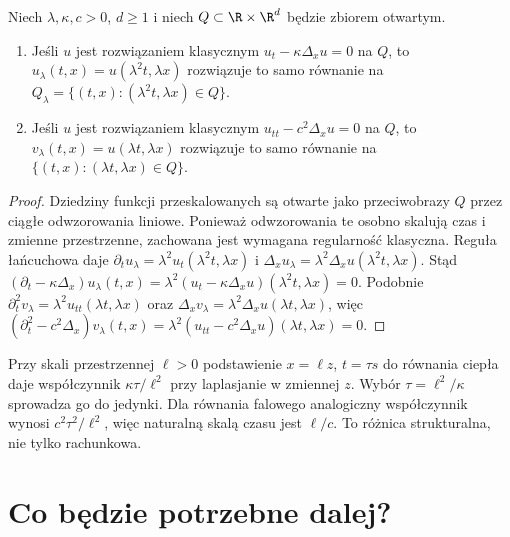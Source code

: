 \begin{stwierdzenie}
Niech $\lambda,\kappa,c>0$, $d\geq1$ i niech
$Q\subset\R\times\R^d$ będzie zbiorem otwartym.
\begin{enumerate}
\item Jeśli $u$ jest rozwiązaniem klasycznym
$u_t-\kappa\Delta_xu=0$ na $Q$, to
$u_\lambda(t,x)=u(\lambda^2t,\lambda x)$
rozwiązuje to samo równanie na
$Q_\lambda=\{(t,x):(\lambda^2t,\lambda x)\in Q\}$.
\item Jeśli $u$ jest rozwiązaniem klasycznym
$u_{tt}-c^2\Delta_xu=0$ na $Q$, to
$v_\lambda(t,x)=u(\lambda t,\lambda x)$
rozwiązuje to samo równanie na
$\{(t,x):(\lambda t,\lambda x)\in Q\}$.
\end{enumerate}
\end{stwierdzenie}
\begin{proof}
Dziedziny funkcji przeskalowanych są otwarte jako przeciwobrazy
$Q$ przez ciągłe odwzorowania liniowe. Ponieważ odwzorowania
te osobno skalują czas i zmienne przestrzenne, zachowana
jest wymagana regularność klasyczna. Reguła łańcuchowa daje
$\partial_tu_\lambda=\lambda^2u_t(\lambda^2t,\lambda x)$
i $\Delta_xu_\lambda=\lambda^2\Delta_xu(\lambda^2t,\lambda x)$.
Stąd
$(\partial_t-\kappa\Delta_x)u_\lambda(t,x)
=\lambda^2(u_t-\kappa\Delta_xu)(\lambda^2t,\lambda x)=0$.
Podobnie $\partial_t^2v_\lambda=\lambda^2u_{tt}(\lambda t,\lambda x)$
oraz $\Delta_xv_\lambda=\lambda^2\Delta_xu(\lambda t,\lambda x)$,
więc $(\partial_t^2-c^2\Delta_x)v_\lambda(t,x)
=\lambda^2(u_{tt}-c^2\Delta_xu)(\lambda t,\lambda x)=0$.
\end{proof}

Przy skali przestrzennej $\ell>0$ podstawienie $x=\ell z$,
$t=\tau s$ do równania ciepła daje współczynnik
$\kappa\tau/\ell^2$ przy laplasjanie w zmiennej $z$.
Wybór $\tau=\ell^2/\kappa$ sprowadza go do jedynki.
Dla równania falowego analogiczny współczynnik wynosi
$c^2\tau^2/\ell^2$, więc naturalną skalą czasu jest $\ell/c$.
To różnica strukturalna, nie tylko rachunkowa.

\section{Co będzie potrzebne dalej?}
\label{sec:pde-outlook}

